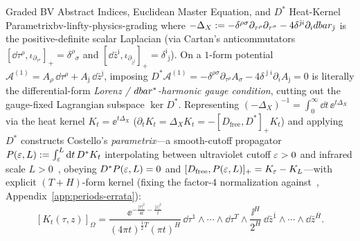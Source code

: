 \begin{zkmodule}{Graded BV Abstract Indices, Euclidean Master Equation, and $D^*$ Heat-Kernel Parametrix}{bv-linfty-physics-grading}
where $-\Delta_X := -\delta^{\rho\sigma}\partial_{\tau^\rho}\partial_{\tau^\sigma} - 4\delta^{\bar{\jmath}i}\partial_idbar_{\bar{\jmath}}$ is the positive-definite scalar Laplacian (via Cartan's anticommutators $[\dd\tau^\rho,\iota_{\partial_{\tau^\sigma}}]_+ = \delta^\rho{}_\sigma$ and $[\dd\bar{z}^{\bar{\imath}},\iota_{\partial_{\bar{z}^{\bar{\jmath}}}}]_+ = \delta^{\bar{\imath}}{}_{\bar{\jmath}}$). On a $1$-form potential $\mathcal{A}^{(1)} = A_\rho\,\dd\tau^\rho + A_{\bar{\jmath}}\,\dd\bar{z}^{\bar{\jmath}}$, imposing $D^*\mathcal{A}^{(1)} = -\delta^{\rho\sigma}\partial_{\tau^\rho}A_\sigma - 4\delta^{\bar{\jmath}i}\partial_i A_{\bar{\jmath}} = 0$ is literally the differential-form \emph{Lorenz / $dbar^*$-harmonic gauge condition}, cutting out the gauge-fixed Lagrangian subspace $\ker D^*$. Representing $(-\Delta_X)^{-1} = \int_0^\infty\dd t\,\ee^{t\Delta_X}$ via the heat kernel $K_t = \ee^{t\Delta_X}$ ($\partial_t K_t = \Delta_X K_t = -[D_{\mathrm{free}}, D^*]_+ K_t$) and applying $D^*$ constructs Costello's \emph{parametrix}---a smooth-cutoff propagator $P(\varepsilon,L) := \int_\varepsilon^L\mathrm{d} t\,D^* K_t$ interpolating between ultraviolet cutoff $\varepsilon > 0$ and infrared scale $L > 0$~\cite{Costello}, obeying $D^* P(\varepsilon,L) = 0$ and $[D_{\mathrm{free}}, P(\varepsilon,L)]_+ = K_\varepsilon - K_L$---with explicit $(T+H)$-form kernel (fixing the factor-$4$ normalization against~\cite{WW24}, Appendix~\ref{app:periods-errata}):
\begin{equation}
\label{eq:ht-heat-kernel-explicit}
[K_t(\tau,z)]_\Omega = \frac{\ee^{-\frac{|\tau|^2}{4t} - \frac{|z|^2}{t}}}{(4\pi t)^{\frac{1}{2}T}(\pi t)^H}\,\dd\tau^1\wedge\cdots\wedge\dd\tau^T\wedge\frac{\ii^H}{2^H}\,\dd\bar{z}^{\bar{1}}\wedge\cdots\wedge\dd\bar{z}^{\bar{H}}.
\end{equation}
\end{zkmodule}

